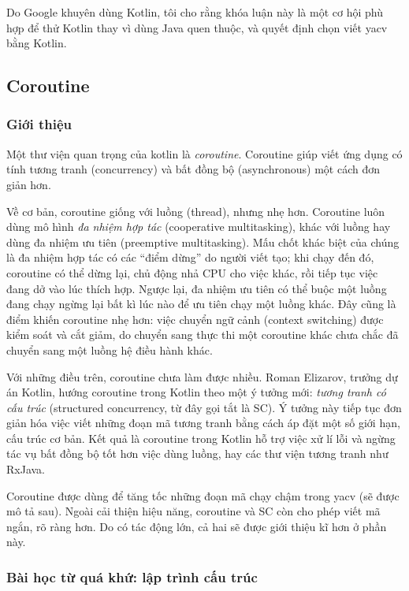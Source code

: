 \documentclass[../../thesis]{subfiles}
\begin{document}
Do Google khuyên dùng Kotlin, tôi cho rằng khóa luận này là một cơ hội phù hợp
để thử Kotlin thay vì dùng Java quen thuộc, và quyết định chọn viết yacv bằng
Kotlin.

\subsection{Coroutine}\label{sec:coroutine}

\subsubsection{Giới thiệu}

Một thư viện quan trọng của kotlin là \emph{coroutine}. Coroutine giúp viết ứng
dụng có tính tương tranh (concurrency) và bất đồng bộ (asynchronous) một cách
đơn giản hơn.

Về cơ bản, coroutine giống với luồng (thread), nhưng nhẹ hơn. Coroutine luôn
dùng mô hình \emph{đa nhiệm hợp tác} (cooperative multitasking), khác với luồng
hay dùng đa nhiệm ưu tiên (preemptive multitasking). Mấu chốt khác biệt của
chúng là đa nhiệm hợp tác có các ``điểm dừng'' do người viết tạo; khi chạy đến
đó, coroutine có thể dừng lại, chủ động nhả CPU cho việc khác, rồi tiếp tục việc
đang dở vào lúc thích hợp. Ngược lại, đa nhiệm ưu tiên có thể buộc một luồng
đang chạy ngừng lại bất kì lúc nào để ưu tiên chạy một luồng khác. Đây cũng là
điểm khiến coroutine nhẹ hơn: việc chuyển ngữ cảnh (context switching) được kiểm
soát và cắt giảm, do chuyển sang thực thi một coroutine khác chưa chắc đã chuyển
sang một luồng hệ điều hành khác.

Với những điều trên, coroutine chưa làm được nhiều. Roman Elizarov, trưởng dự án
Kotlin, hướng coroutine trong Kotlin theo một ý tưởng mới: \emph{tương tranh có
cấu trúc} (structured concurrency, từ đây gọi tắt là SC). Ý tưởng này tiếp tục
đơn giản hóa việc viết những đoạn mã tương tranh bằng cách áp đặt một số giới
hạn, cấu trúc cơ bản. Kết quả là coroutine trong Kotlin hỗ trợ việc xử lí lỗi và
ngừng tác vụ bất đồng bộ tốt hơn việc dùng luồng, hay các thư viện tương tranh
như RxJava.

Coroutine được dùng để tăng tốc những đoạn mã chạy chậm trong yacv (sẽ được mô
tả sau). Ngoài cải thiện hiệu năng, coroutine và SC còn cho phép viết mã ngắn,
rõ ràng hơn. Do có tác động lớn, cả hai sẽ được giới thiệu kĩ hơn ở phần này.

\subsubsection{Bài học từ quá khứ: lập trình cấu trúc}
\end{document}
